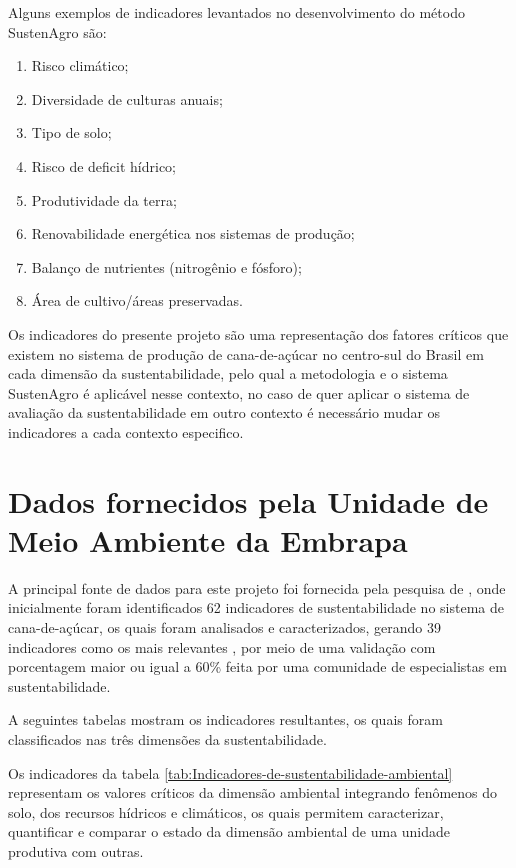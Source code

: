 Alguns exemplos de indicadores levantados no desenvolvimento do método
SustenAgro são: 
\begin{enumerate}
\item Risco climático; 
\item Diversidade de culturas anuais; 
\item Tipo de solo; 
\item Risco de deficit hídrico; 
\item Produtividade da terra; 
\item Renovabilidade energética nos sistemas de produção; 
\item Balanço de nutrientes (nitrogênio e fósforo); 
\item Área de cultivo/áreas preservadas.
\end{enumerate}
Os indicadores do presente projeto são uma representação dos fatores
críticos que existem no sistema de produção de cana-de-açúcar no centro-sul
do Brasil em cada dimensão da sustentabilidade, pelo qual a metodologia
e o sistema SustenAgro é aplicável nesse contexto, no caso de quer
aplicar o sistema de avaliação da sustentabilidade em outro contexto
é necessário mudar os indicadores a cada contexto especifico. 

\section{Dados fornecidos pela Unidade de Meio Ambiente da Embrapa }

A principal fonte de dados para este projeto foi fornecida pela pesquisa
de \citet{oliveira:2013}, onde inicialmente foram identificados 62
indicadores de sustentabilidade no sistema de cana-de-açúcar, os quais
foram analisados e caracterizados, gerando 39 indicadores como os
mais relevantes \citet{BRUMATTI:2015}, por meio de uma validação
com porcentagem maior ou igual a 60\% feita por uma comunidade de
especialistas em sustentabilidade.

A seguintes tabelas mostram os indicadores resultantes, os quais foram
classificados nas três dimensões da sustentabilidade.

Os indicadores da tabela \ref{tab:Indicadores-de-sustentabilidade-ambiental}
representam os valores críticos da dimensão ambiental integrando fenômenos
do solo, dos recursos hídricos e climáticos, os quais permitem caracterizar,
quantificar e comparar o estado da dimensão ambiental de uma unidade
produtiva com outras.

